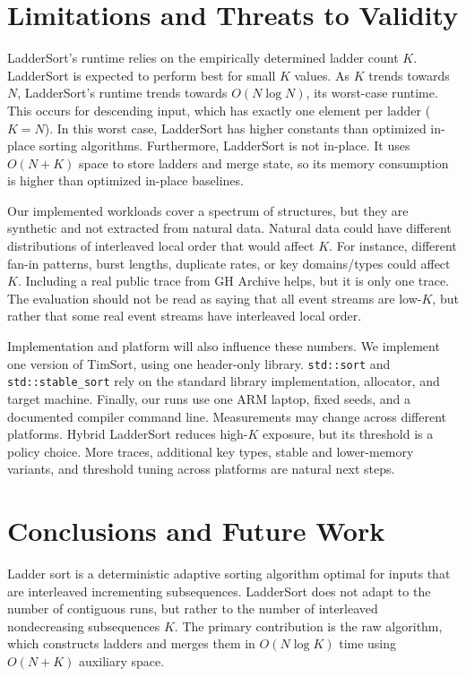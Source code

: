 \documentclass[10pt]{article}
\begin{document}
\section{\texorpdfstring{\textbf{Limitations and Threats to Validity}}{Limitations and Threats to Validity}}\label{limitations-and-threats-to-validity}


LadderSort's runtime relies on the empirically determined ladder count \(K\).
LadderSort is expected to perform best for small \(K\) values. As \(K\) trends
towards \(N\), LadderSort's runtime trends towards \(O(N\log N)\), its
worst-case runtime. This occurs for descending input, which has exactly one
element per ladder (\(K=N\)). In this worst case, LadderSort has higher
constants than optimized in-place sorting algorithms. Furthermore, LadderSort
is not in-place. It uses \(O(N+K)\) space to store ladders and merge state, so
its memory consumption is higher than optimized in-place baselines.

Our implemented workloads cover a spectrum of structures, but they are
synthetic and not extracted from natural data. Natural data could have
different distributions of interleaved local order that would affect \(K\). For
instance, different fan-in patterns, burst lengths, duplicate rates, or key
domains/types could affect \(K\). Including a real public trace from GH Archive
helps, but it is only one trace. The evaluation should not be read as saying
that all event streams are low-\(K\), but rather that some real event streams
have interleaved local order.

Implementation and platform will also influence these numbers. We implement
one version of TimSort, using one header-only library. \texttt{std::sort} and
\texttt{std::stable\_sort} rely on the standard library implementation,
allocator, and target machine. Finally, our runs use one ARM laptop, fixed
seeds, and a documented compiler command line. Measurements may change across
different platforms. Hybrid LadderSort reduces high-\(K\) exposure, but its
threshold is a policy choice. More traces, additional key types, stable and
lower-memory variants, and threshold tuning across platforms are natural next
steps.

\section{\texorpdfstring{\textbf{Conclusions and Future Work}}{Conclusions and Future Work}}\label{conclusions-and-future-work}
Ladder sort is a deterministic adaptive sorting algorithm optimal for inputs that are interleaved incrementing subsequences. LadderSort does not adapt to the number of contiguous runs, but rather to the number of interleaved nondecreasing subsequences \(K\). The primary contribution is the raw algorithm, which constructs ladders and merges them in \(O(N\log K)\) time using \(O(N+K)\) auxiliary space.
\end{document}
